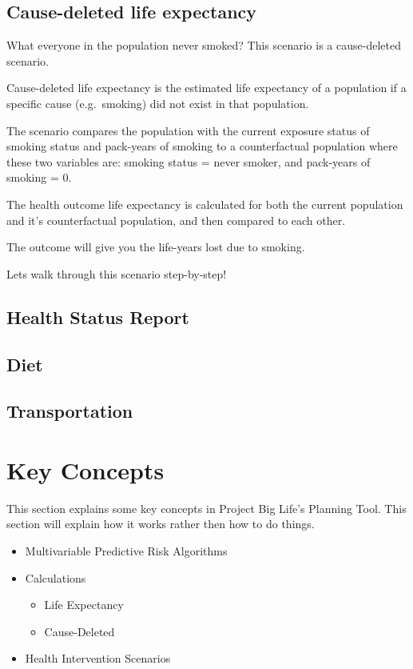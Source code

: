 \documentclass[]{book}
\providecommand{\tightlist}{%
  \setlength{\itemsep}{0pt}\setlength{\parskip}{0pt}}
\begin{document}
\section{Cause-deleted life
expectancy}\label{cause-deleted-life-expectancy}

What everyone in the population never smoked? This scenario is a
cause-deleted scenario.

Cause-deleted life expectancy is the estimated life
expectancy of a population if a specific cause (e.g.~smoking) did not
exist in that population.

The scenario compares the population with the current exposure status of
smoking status and pack-years of smoking to a counterfactual population
where these two variables are: smoking status = never smoker, and
pack-years of smoking = 0.

The health outcome life expectancy is calculated for both the current
population and it's counterfactual population, and then compared to each
other.

The outcome will give you the life-years lost due to smoking.

Lets walk through this scenario step-by-step!

\section{Health Status Report}\label{health-status-report}

\section{Diet}\label{diet}

\section{Transportation}\label{transportation}

\chapter{Key Concepts}\label{keyconcepts}

This section explains some key concepts in Project Big Life's Planning
Tool. This section will explain how it works rather then how to do
things.

\begin{itemize}
\item
  Multivariable Predictive Risk Algorithms
\item
  Calculations

  \begin{itemize}
  \tightlist
  \item
    Life Expectancy
  \item
    Cause-Deleted
  \end{itemize}
\item
  Health Intervention Scenarios
\end{itemize}
\end{document}
